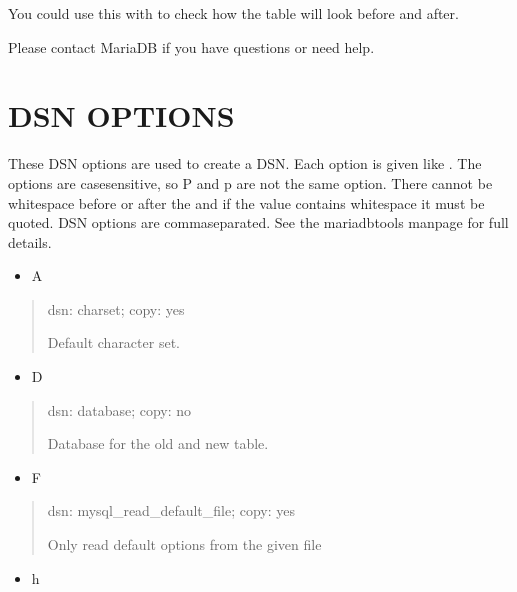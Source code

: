 \documentclass[letterpaper,10pt,english]{sphinxmanual}
\begin{document}
You could use this with {\hyperref[\detokenize{mariadb-schema-change:cmdoption-mariadb-schema-change-dry-run}]{}} to check how the table will look before and after.

Please contact MariaDB if you have questions or need help.


\section{DSN OPTIONS}
\label{\detokenize{mariadb-schema-change:dsn-options}}
These DSN options are used to create a DSN.  Each option is given like
.  The options are case\sphinxhyphen{}sensitive, so P and p are not the
same option.  There cannot be whitespace before or after the \sphinxcode{\sphinxupquote{=}} and
if the value contains whitespace it must be quoted.  DSN options are
comma\sphinxhyphen{}separated.  See the mariadb\sphinxhyphen{}tools manpage for full details.
\begin{itemize}
\item {} 
A

\end{itemize}
\begin{quote}

dsn: charset; copy: yes

Default character set.
\end{quote}
\begin{itemize}
\item {} 
D

\end{itemize}
\begin{quote}

dsn: database; copy: no

Database for the old and new table.
\end{quote}
\begin{itemize}
\item {} 
F

\end{itemize}
\begin{quote}

dsn: mysql\_read\_default\_file; copy: yes

Only read default options from the given file
\end{quote}
\begin{itemize}
\item {} 
h

\end{itemize}
\end{document}
